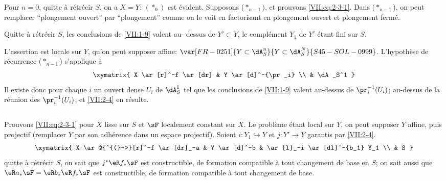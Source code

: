 Pour $n=0$, quitte à rétrécir $S$, on a $X=Y$: $(\ast_0)$ est évident. 
Supposons ($\ast_{n-1})$, et prouvons \eqref{VII:eq:2-3-1}. Dans 
($\ast_{n-1}$), on peut remplacer ``plongement ouvert'' par ``plongement'' 
comme on le voit en factorisant en plongement ouvert et plongement fermé. 





\begin{lemma_}\label{VII:2-4}
Quitte à rétrécir $S$, les conclusions de \ref{VII:1-9} valent au-
dessus de $Y'\subset Y$, le complément $Y_1$ de $Y'$ étant fini sur $S$. 
\end{lemma_}

L'assertion est locale sur $Y$, qu'on peut supposer affine: $\var[FR-0251]{Y\subset \dA_S^n}{Y\subset \dA_S^N}{S45-SOL-0999}$. 
L'hypothèse de récurrence ($\ast_{n-1}$) s'applique à 
\[\xymatrix{
  X \ar[r]^-f \ar[dr] 
    & Y \ar[d]^-{\pr_i} \\
  & \dA_S^1 
}\]
Il existe donc pour chaque $i$ un ouvert dense $U_i$ de $\dA_S^1$ tel que les 
conclusions de \ref{VII:1-9} valent au-dessus de $\pr_i^{-1}(U_i)$;  
au-dessus de la réunion des $\pr_i^{-1}(U_i)$, et \ref{VII:2-4} en résulte. 





\addtocounter{subsection}{1} %
\subsection{}\label{VII:2-6}

Prouvons \eqref{VII:eq:2-3-1} pour $X$ lisse sur $S$ et $\sF$ localement 
constant sur $X$. Le problème étant local sur $Y$, on peut supposer $Y$ 
affine, puis projectif (remplacer $Y$ par son adhérence dans un espace 
projectif). Soient $i:Y_1\hookrightarrow Y$ et $j:Y' \to Y$ garantis par 
\ref{VII:2-4}. 
\[\xymatrix{
  X \ar@{^{(}->}[r]^-f \ar[dr]_-a 
    & Y \ar[d]^-b 
    & \ar[l]_-i \ar[dl]^-{b_1} Y_1 \\
  & S 
}\] 
quitte à rétrécir $S$, on sait que $j^\ast \eR f_\ast \sF$ est 
constructible, de formation compatible à tout changement de base en $S$; on 
sait aussi que $\eR a_\ast \sF = \eR b_\ast \eR f_\ast \sF$ est constructible, 
de formation compatible à tout changement de base. 

